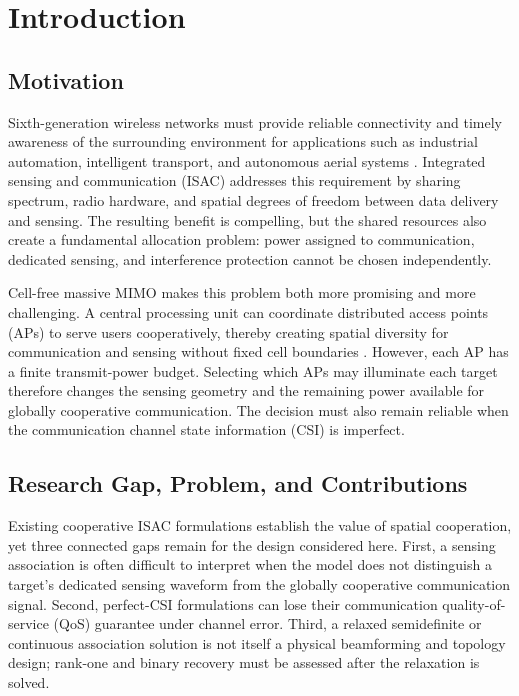 \chapter{Introduction}\label{ch:intro}

\section{Motivation}

Sixth-generation wireless networks must provide reliable connectivity and
timely awareness of the surrounding environment for applications such as
industrial automation, intelligent transport, and autonomous aerial systems
\autocite{dongSensingService6G2023,kaushikIntegratedSensingCommunications2024}.
\autocite{liuIntegratedSensingCommunications2022,liuJointRadarCommunication2020}
Integrated sensing and communication (ISAC) addresses this requirement by
sharing spectrum, radio hardware, and spatial degrees of freedom between data
delivery and sensing. The resulting benefit is compelling, but the shared
resources also create a fundamental allocation problem: power assigned to
communication, dedicated sensing, and interference protection cannot be chosen
independently.

Cell-free massive MIMO makes this problem both more promising and more
challenging. A central processing unit can coordinate distributed access points
(APs) to serve users cooperatively, thereby creating spatial diversity for
communication and sensing without fixed cell boundaries
\autocite{femeniasScalableCellfreeMassive2025,demirhanCellfreeISACMIMO2025}.
\autocite{maoCommunicationSensingRegion2024,liNetworkedISAC2024}
However, each AP has a finite transmit-power budget. Selecting which APs may
illuminate each target therefore changes the sensing geometry and the remaining
power available for globally cooperative communication. The decision must also
remain reliable when the communication channel state information (CSI) is
imperfect.

\section{Research Gap, Problem, and Contributions}

Existing cooperative ISAC formulations establish the value of spatial
cooperation, yet three connected gaps remain for the design considered here.
First, a sensing association is often difficult to interpret when the model
does not distinguish a target's dedicated sensing waveform from the globally
cooperative communication signal. Second, perfect-CSI formulations can lose
their communication quality-of-service (QoS) guarantee under channel error.
Third, a relaxed semidefinite or continuous association solution is not itself
a physical beamforming and topology design; rank-one and binary recovery must
be assessed after the relaxation is solved.

